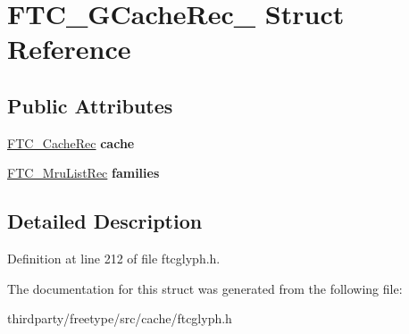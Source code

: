 \hypertarget{struct_f_t_c___g_cache_rec__}{}\section{F\+T\+C\+\_\+\+G\+Cache\+Rec\+\_\+ Struct Reference}
\label{struct_f_t_c___g_cache_rec__}
\subsection*{Public Attributes}
\begin{DoxyCompactItemize}
\item 
\mbox{\label{struct_f_t_c___g_cache_rec___ad89d248ec407429c9fb217bc8f64ad75}} 
\hyperlink{struct_f_t_c___cache_rec__}{F\+T\+C\+\_\+\+Cache\+Rec} {\bfseries cache}
\item 
\mbox{\label{struct_f_t_c___g_cache_rec___a1fc527b6d1198813130df1568837d4b4}} 
\hyperlink{struct_f_t_c___mru_list_rec__}{F\+T\+C\+\_\+\+Mru\+List\+Rec} {\bfseries families}
\end{DoxyCompactItemize}


\subsection{Detailed Description}


Definition at line 212 of file ftcglyph.\+h.



The documentation for this struct was generated from the following file\+:\begin{DoxyCompactItemize}
\item 
thirdparty/freetype/src/cache/ftcglyph.\+h\end{DoxyCompactItemize}
